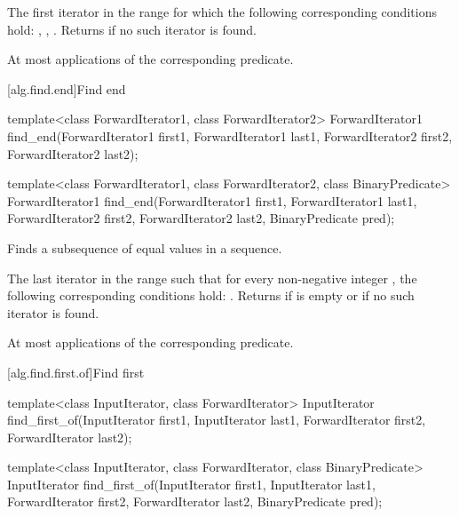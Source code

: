\begin{itemdescr}
\pnum
\returns
The first iterator
in the range
for which the following corresponding
conditions hold:
, , .
Returns  if no such iterator is found.

\pnum
\complexity
At most
applications of the corresponding predicate.
\end{itemdescr}

[alg.find.end]{Find end}

%
\begin{itemdecl}
template<class ForwardIterator1, class ForwardIterator2>
  ForwardIterator1
    find_end(ForwardIterator1 first1, ForwardIterator1 last1,
             ForwardIterator2 first2, ForwardIterator2 last2);

template<class ForwardIterator1, class ForwardIterator2,
         class BinaryPredicate>
  ForwardIterator1
    find_end(ForwardIterator1 first1, ForwardIterator1 last1,
             ForwardIterator2 first2, ForwardIterator2 last2,
             BinaryPredicate pred);
\end{itemdecl}

\begin{itemdescr}
\pnum
\effects
Finds a subsequence of equal values in a sequence.

\pnum
\returns
The last iterator
in the range 
such that for every non-negative integer
,
the following corresponding conditions hold:
.
Returns 
if
 is empty or if
no such iterator is found.

\pnum
\complexity
At most
applications of the corresponding predicate.
\end{itemdescr}

[alg.find.first.of]{Find first}

%
\begin{itemdecl}
template<class InputIterator, class ForwardIterator>
  InputIterator
    find_first_of(InputIterator first1, InputIterator last1,
                  ForwardIterator first2, ForwardIterator last2);

template<class InputIterator, class ForwardIterator,
          class BinaryPredicate>
  InputIterator
    find_first_of(InputIterator first1, InputIterator last1,
                  ForwardIterator first2, ForwardIterator last2,
                  BinaryPredicate pred);
\end{itemdecl}

